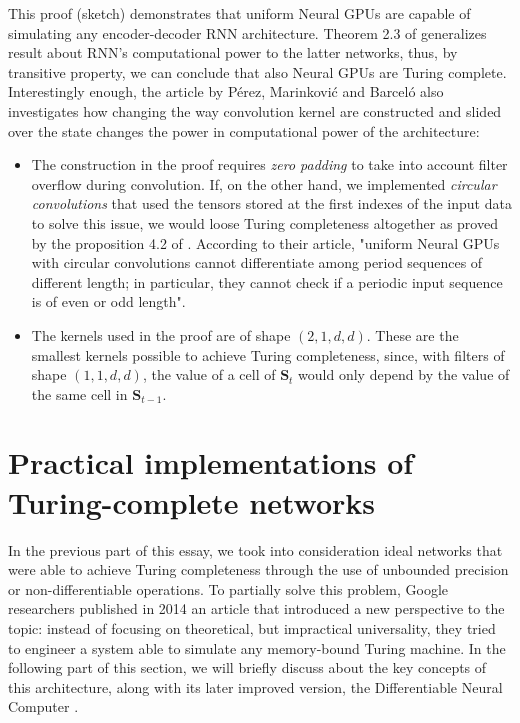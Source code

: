 \documentclass{article}
\begin{document}
This proof (sketch) demonstrates that uniform Neural GPUs are capable of simulating any encoder-decoder RNN architecture. Theorem 2.3 of \cite{PER19} generalizes \cite{SIE95} result about RNN's computational power to the latter networks, thus, by transitive property, we can conclude that also Neural GPUs are Turing complete. Interestingly enough, the article by Pérez, Marinković and Barceló also investigates how changing the way convolution kernel are constructed and slided over the state changes the power in computational power of the architecture:

\begin{itemize}
    \item The construction in the proof requires \textit{zero padding} to take into account filter overflow during convolution. If, on the other hand, we implemented \textit{circular convolutions} that used the tensors stored at the first indexes of the input data to solve this issue, we would loose Turing completeness altogether as proved by the proposition 4.2 of \cite{PER19}. According to their article, "uniform Neural GPUs with circular convolutions cannot differentiate among period sequences of different length; in particular, they cannot check if a periodic input sequence is of even or odd length".
    \item The kernels used in the proof are of shape $(2,1,d,d)$. These are the smallest kernels possible to achieve Turing completeness, since, with filters of shape $(1,1,d,d)$, the value of a cell of $\mathbf{S}_t$ would only depend by the value of the same cell in $\mathbf{S}_{t-1}$.
\end{itemize}

\section{Practical implementations of Turing-complete networks}

In the previous part of this essay, we took into consideration ideal networks that were able to achieve Turing completeness through the use of unbounded precision or non-differentiable operations. To partially solve this problem, Google researchers published in 2014 an article \cite{GRA14} that introduced a new perspective to the topic: instead of focusing on theoretical, but impractical universality, they tried to engineer a system able to simulate any memory-bound Turing machine. In the following part of this section, we will briefly discuss about the key concepts of this architecture, along with its later improved version, the Differentiable Neural Computer \cite{GRA16}.
\end{document}
